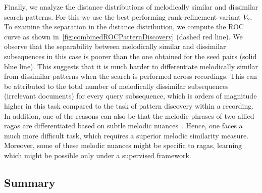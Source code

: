 
Finally, we analyze the distance distributions of melodically similar and dissimilar search patterns. For this we use the best performing rank-refinement variant $V_2$. To examine the separation in the distance distribution, we compute the ROC curve as shown in~\ref{fig:combinedROCPatternDiscovery} (dashed red line). We observe that the separability between melodically similar and dissimilar subsequences in this case is poorer than the one obtained for the seed pairs (solid blue line). This suggests that it is much harder to differentiate melodically similar from dissimilar patterns when the search is performed across recordings. This can be attributed to the total number of melodically dissimilar subsequences (irrelevant documents) for every query subsequence, which is orders of magnitude higher in this task compared to the task of pattern discovery within a recording. In addition, one of the reasons can also be that the melodic phrases of two allied \glspl{raga}  are differentiated based on subtle melodic nuances~\cite{Viswanathan2004}. Hence, one faces a much more difficult task, which requires a superior melodic similarity measure. Moreover, some of these melodic nuances might be specific to \glspl{raga}, learning which might be possible only under a supervised framework. 



\subsection{Summary}
\label{sec:patterns_pattern_discovery_summary}


